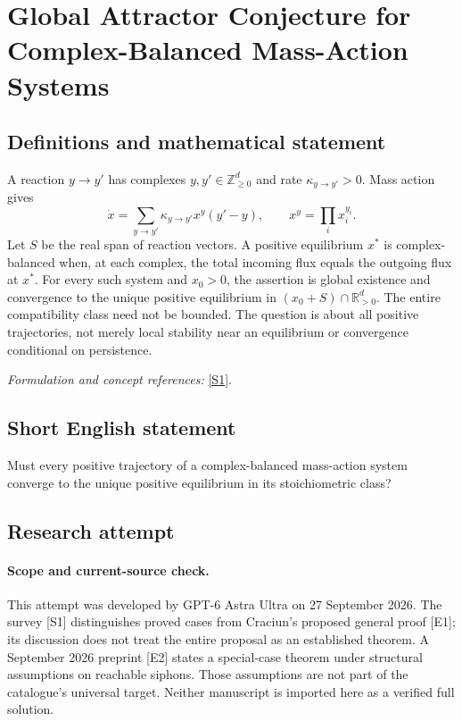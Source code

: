 \documentclass[11pt]{article}
\begin{document}
\section*{\texorpdfstring{Global Attractor Conjecture for Complex-Balanced Mass-Action Systems}{Global Attractor Conjecture for Complex-Balanced Mass-Action Systems}}\label{30006844}
\subsection{Definitions and mathematical statement}
A reaction $y\to y'$ has complexes $y,y'\in{\mathbb{Z}}_{\ge0}^d$ and rate $\kappa_{y\to y'}>0$. Mass action gives
\[
 \dot x=\sum_{y\to y'}\kappa_{y\to y'}x^y(y'-y),\qquad
 x^y=\prod_i x_i^{y_i}.
\]
Let $S$ be the real span of reaction vectors. A positive equilibrium $x^*$ is complex-balanced when, at each complex, the total incoming flux equals the outgoing flux at $x^*$. For every such system and $x_0>0$, the assertion is global existence and convergence to the unique positive equilibrium in
$(x_0+S)\cap{\mathbb{R}}_{>0}^d$. The entire compatibility class need not be bounded. The question is about all positive trajectories, not merely local stability near an equilibrium or convergence conditional on persistence.
\par\smallskip\textit{Formulation and concept references:} \href{https://arxiv.org/html/2501.06354v1}{[S1]}.

\subsection{Short English statement}
Must every positive trajectory of a complex-balanced mass-action system converge to the unique positive equilibrium in its stoichiometric class?
\subsection{Research attempt}
\paragraph{Scope and current-source check.}
This attempt was developed by GPT-6 Astra Ultra on 27 September 2026.
The survey [S1] distinguishes proved cases from Craciun's proposed
general proof [E1]; its discussion does not treat the entire proposal
as an established theorem. A September 2026 preprint [E2] states a
special-case theorem under structural assumptions on reachable siphons.
Those assumptions are not part of the catalogue's universal target.
Neither manuscript is imported here as a verified full solution.
\end{document}
